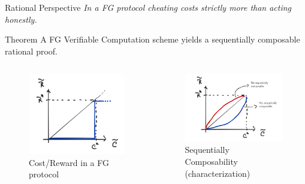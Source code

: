 \begin{frame}[t]{Rational Perspective}
\textit{In a FG protocol cheating costs strictly more than acting honestly.}\pause\\\medskip

\begin{block}{Theorem}
	A FG Verifiable Computation scheme yields a sequentially composable rational proof.
\end{block}
\begin{columns}
	\begin{figure}
		\includegraphics[scale=0.14]{pics/fg-sc.png}
		\caption{Cost/Reward in a FG protocol}
	\end{figure}
		\begin{figure}
			\includegraphics[scale=0.15]{pics/sc-char.png}
			\caption{Sequentially Composability (characterization)}
		\end{figure}
			
\end{columns}
\end{frame}

